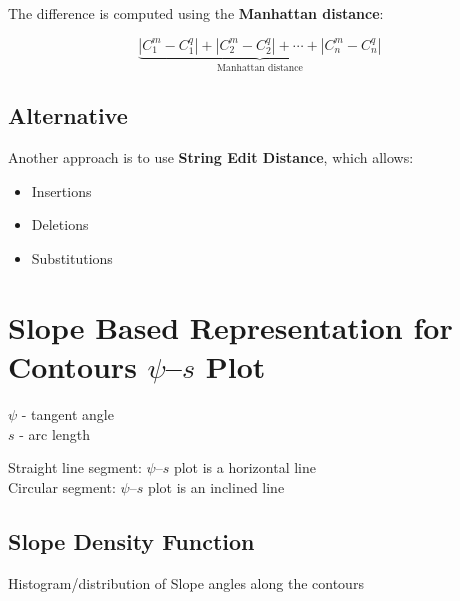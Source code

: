 \documentclass[11pt]{article}
\theoremstyle{definition}
\begin{document}
The difference is computed using the \textbf{Manhattan distance}:

\[
\underbrace{
|C_1^m - C_1^q| + |C_2^m - C_2^q| + \cdots + |C_n^m - C_n^q|
}_{\text{Manhattan distance}}
\]

\subsection{Alternative}

Another approach is to use \textbf{String Edit Distance}, which allows:
\begin{itemize}
    \item Insertions
    \item Deletions
    \item Substitutions
\end{itemize}

\section{Slope Based Representation for Contours $\psi$--$s$ Plot}

$\psi$ - tangent angle\\
$s$ - arc length

Straight line segment: $\psi$--$s$ plot is a horizontal line \\
Circular segment: $\psi$--$s$ plot is an inclined line

\subsection{Slope Density Function}

Histogram/distribution of Slope angles along the contours

\begin{figure}[h]
\centering
{}
\end{figure}
\end{document}
